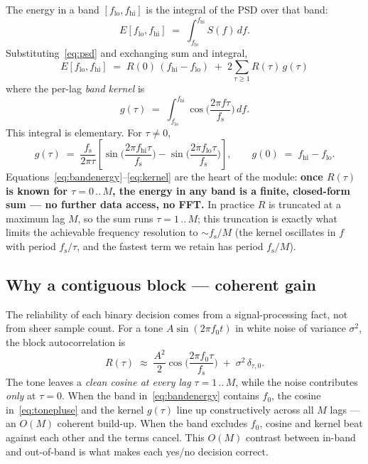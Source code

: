 \documentclass[11pt]{article}
\newcommand{\R}{R}
\newcommand{\fs}{f_{\mathrm{s}}}
\begin{document}
The energy in a band $[f_{\mathrm{lo}}, f_{\mathrm{hi}}]$ is the integral of the
PSD over that band:
\begin{equation}
  E[f_{\mathrm{lo}},f_{\mathrm{hi}}]
   \;=\; \int_{f_{\mathrm{lo}}}^{f_{\mathrm{hi}}} S(f)\,df .
\end{equation}
Substituting~\eqref{eq:psd} and exchanging sum and integral,
\begin{equation}
  \boxed{\;
  E[f_{\mathrm{lo}},f_{\mathrm{hi}}]
   \;=\; \R(0)\,(f_{\mathrm{hi}}-f_{\mathrm{lo}})
        \;+\; 2\sum_{\tau\ge 1}\R(\tau)\,g(\tau)
  \;}
  \label{eq:bandenergy}
\end{equation}
where the per-lag \emph{band kernel} is
\begin{equation}
  g(\tau) \;=\; \int_{f_{\mathrm{lo}}}^{f_{\mathrm{hi}}}
                \cos\!\Big(\frac{2\pi f\tau}{\fs}\Big)\,df .
  \label{eq:kerneldef}
\end{equation}
This integral is elementary. For $\tau\ne 0$,
\begin{equation}
  g(\tau) \;=\; \frac{\fs}{2\pi\tau}
    \left[\sin\!\Big(\frac{2\pi f_{\mathrm{hi}}\tau}{\fs}\Big)
        - \sin\!\Big(\frac{2\pi f_{\mathrm{lo}}\tau}{\fs}\Big)\right],
  \qquad
  g(0) \;=\; f_{\mathrm{hi}} - f_{\mathrm{lo}}.
  \label{eq:kernel}
\end{equation}
Equations~\eqref{eq:bandenergy}--\eqref{eq:kernel} are the heart of the module:
\textbf{once $\R(\tau)$ is known for $\tau=0\,..\,M$, the energy in any band is a
finite, closed-form sum --- no further data access, no FFT.} In practice $\R$ is
truncated at a maximum lag $M$, so the sum runs $\tau=1\,..\,M$; this truncation
is exactly what limits the achievable frequency resolution to $\sim \fs/M$ (the
kernel oscillates in $f$ with period $\fs/\tau$, and the fastest term we retain
has period $\fs/M$).

\subsection{Why a contiguous block --- coherent gain}

The reliability of each binary decision comes from a signal-processing fact, not
from sheer sample count. For a tone $A\sin(2\pi f_0 t)$ in white noise of variance
$\sigma^2$, the block autocorrelation is
\begin{equation}
  \R(\tau) \;\approx\; \frac{A^2}{2}\cos\!\Big(\frac{2\pi f_0\tau}{\fs}\Big)
                       \;+\; \sigma^2\,\delta_{\tau,0}.
  \label{eq:tonepluse}
\end{equation}
The tone leaves a \emph{clean cosine at every lag} $\tau=1\,..\,M$, while the
noise contributes \emph{only} at $\tau=0$. When the band in~\eqref{eq:bandenergy}
contains $f_0$, the cosine in~\eqref{eq:tonepluse} and the kernel
$g(\tau)$ line up constructively across all $M$ lags --- an $O(M)$ coherent
build-up. When the band excludes $f_0$, cosine and kernel beat against each other
and the terms cancel. This $O(M)$ contrast between in-band and out-of-band is what
makes each yes/no decision correct.
\end{document}
